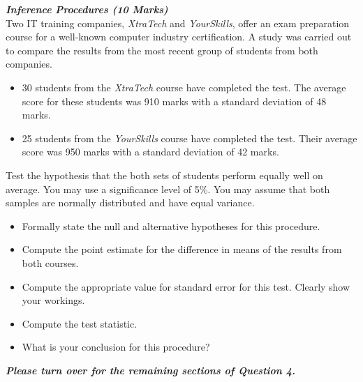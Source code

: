 \begin{itemize}
\begin{itemize}
\end{itemize}

\item[(b)] \textbf{\textit{Inference Procedures (10 Marks)}}\\
Two IT training companies, \textit{XtraTech} and \textit{YourSkills}, offer an exam preparation course for a well-known computer industry certification. A study was carried out to compare the results from the most recent group of students from both companies.
\begin{itemize}

\item[$\bullet$]30 students from the \textit{XtraTech} course have completed the test. The average score for these students was 910 marks with a standard deviation of 48 marks.


\item[$\bullet$]25 students from the \textit{YourSkills} course have completed the test. Their average score was 950 marks with a standard deviation of 42 marks.
\end{itemize}

Test the hypothesis that the both sets of students perform equally well on average. You may use a significance level of 5\%. You may assume that both samples are normally distributed and have equal variance.
\begin{itemize}

\item  Formally state the null and alternative hypotheses for this procedure.

\item  Compute the point estimate for the difference in means of the results from both courses.

\item  Compute the appropriate value for standard error for this test. Clearly show your workings.

\item   Compute the test statistic.

\item   What is your conclusion for this procedure?
\end{itemize}
{
\normalsize
\textit{\textbf{Please turn over for the remaining sections of Question 4.}}
}